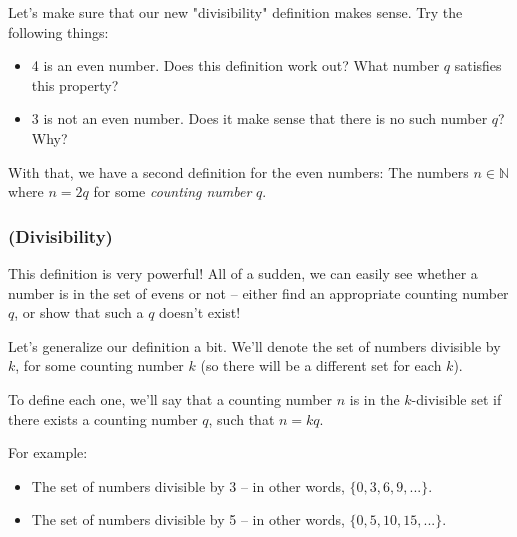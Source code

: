 \begin{exercise}
Let's make sure that our new "divisibility" definition makes sense. Try the following things:
\begin{itemize}
\item 4 is an even number. Does this definition work out? What number $q$ satisfies this property?
\item 3 is not an even number. Does it make sense that there is no such number $q$? Why?
\end{itemize}
\end{exercise}

\hfill

With that, we have a second definition for the even numbers: The numbers $n \in \mathbb{N}$ where $n = 2q$ for some \emph{counting number} $q$. 


\subsubsection{(Divisibility)}

This definition is very powerful! All of a sudden, we can easily see whether a number is in the set of evens or not -- either find an appropriate counting number $q$, or show that such a $q$ doesn't exist!

Let's generalize our definition a bit. We'll denote the set of numbers divisible by $k$, for some counting number $k$ (so there will be a different set for each $k$). 

To define each one, we'll say that a counting number $n$ is in the $k$-divisible set if there exists a counting number $q$, such that $n = kq$.

For example:
\begin{itemize}
\item The set of numbers divisible by 3 -- in other words, $\{0, 3, 6, 9, ...\}$. 
\item The set of numbers divisible by 5 -- in other words, $\{0, 5, 10, 15, ...\}$. 
\end{itemize}


